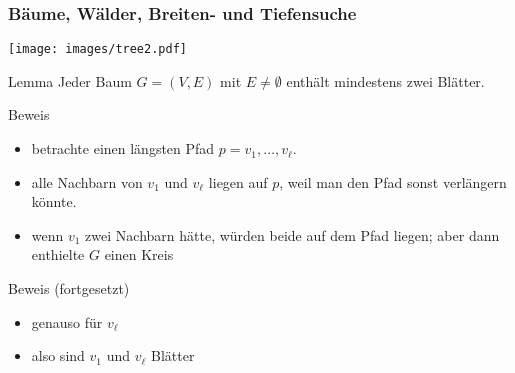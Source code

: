 \documentclass[aspectratio=1610, 11pt]{beamer}
\newcommand{\mytitle}{B\"aume, W\"alder, Breiten- und Tiefensuche}
\begin{document}
\begin{frame}\frametitle{\mytitle}
		\hfill\texttt{[image: images/tree2.pdf]}
	\begin{overprint}
		\begin{block}{Lemma}
			Jeder Baum $G=(V,E)$ mit $E\neq\emptyset$ enth\"alt mindestens zwei Bl\"atter.
		\end{block}
		\begin{exampleblock}{Beweis}
			\begin{itemize}
				\item betrachte einen l\"angsten Pfad $p=v_1,\ldots,v_\ell$.
				\item alle Nachbarn von $v_1$ und $v_\ell$ liegen auf $p$, weil man den Pfad sonst verl\"angern k\"onnte.
				\item wenn $v_1$ zwei Nachbarn h\"atte, w\"urden beide auf dem Pfad liegen; aber dann enthielte $G$ einen Kreis
			\end{itemize}
		\end{exampleblock}
		\begin{exampleblock}{Beweis (fortgesetzt)}
			\begin{itemize}
				\item genauso f\"ur $v_\ell$
				\item also sind $v_1$ und $v_\ell$ Bl\"atter
			\end{itemize}
		\end{exampleblock}
	\end{overprint}
\end{frame}
\end{document}
